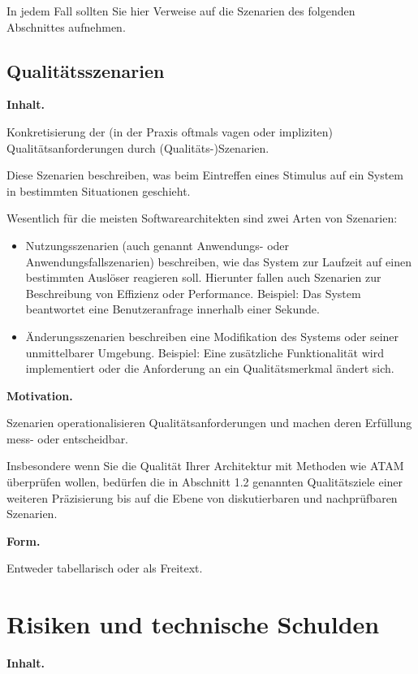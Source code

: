 \documentclass[]{article}
\begin{document}
In jedem Fall sollten Sie hier Verweise auf die Szenarien des folgenden
Abschnittes aufnehmen.

\subsection{Qualitätsszenarien}\label{_qualit_tsszenarien}

\textbf{Inhalt.}

Konkretisierung der (in der Praxis oftmals vagen oder impliziten)
Qualitätsanforderungen durch (Qualitäts-)Szenarien.

Diese Szenarien beschreiben, was beim Eintreffen eines Stimulus auf ein
System in bestimmten Situationen geschieht.

Wesentlich für die meisten Softwarearchitekten sind zwei Arten von
Szenarien:

\begin{itemize}
\item
  Nutzungsszenarien (auch genannt Anwendungs- oder
  Anwendungsfallszenarien) beschreiben, wie das System zur Laufzeit auf
  einen bestimmten Auslöser reagieren soll. Hierunter fallen auch
  Szenarien zur Beschreibung von Effizienz oder Performance. Beispiel:
  Das System beantwortet eine Benutzeranfrage innerhalb einer Sekunde.
\item
  Änderungsszenarien beschreiben eine Modifikation des Systems oder
  seiner unmittelbarer Umgebung. Beispiel: Eine zusätzliche
  Funktionalität wird implementiert oder die Anforderung an ein
  Qualitätsmerkmal ändert sich.
\end{itemize}

\textbf{Motivation.}

Szenarien operationalisieren Qualitätsanforderungen und machen deren
Erfüllung mess- oder entscheidbar.

Insbesondere wenn Sie die Qualität Ihrer Architektur mit Methoden wie
ATAM überprüfen wollen, bedürfen die in Abschnitt 1.2 genannten
Qualitätsziele einer weiteren Präzisierung bis auf die Ebene von
diskutierbaren und nachprüfbaren Szenarien.

\textbf{Form.}

Entweder tabellarisch oder als Freitext.

\section{Risiken und technische Schulden}\label{section-technical-risks}

\textbf{Inhalt.}
\end{document}

